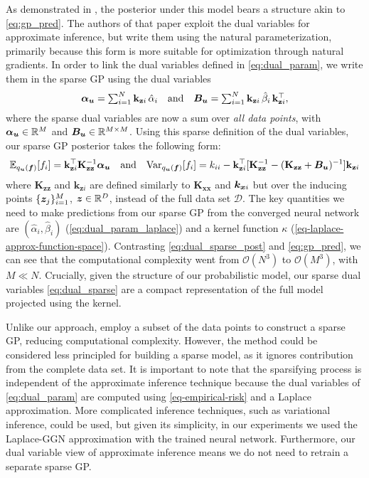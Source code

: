 \documentclass{article} %
\newcommand{\dataset}{\ensuremath{\mathcal{D}}}
\newcommand{\mathbold}[1]{\bm{#1}}
\newcommand{\mbf}[1]{\mathbf{#1}}
\newcommand{\T}{\top}
\newcommand{\valpha}[0]{\mathbold{\alpha}}
\newcommand{\MBeta}[0]{\mathbold{B}}
\newcommand{\MKzz}{\mbf{K}_{\mbf{z}\mbf{z}}}
\newcommand{\MKxx}{\mbf{K}_{\mbf{x}\mbf{x}}}
\newcommand{\vkzi}{\mbf{k}_{\mbf{z}i}}
\newcommand{\vkzs}{\mbf{k}_{\mbf{z}i}}
\newcommand{\myexpect}{\mathbb{E}}
\begin{document}
As demonstrated in \cite{adam2021dual}, the posterior under this model bears a structure akin to \cref{eq:gp_pred}. The authors of that paper exploit the dual variables for approximate inference, but write them using the natural parameterization, primarily because this form is more suitable for optimization through natural gradients. In order to link the dual variables defined in \cref{eq:dual_param}, we write them in the sparse GP using the dual variables
%
\begin{equation} \textstyle
  \valpha_{\vu}  =  \sum_{i=1}^N  \vkzi \, \hat{\alpha}_{i}
  \quad \text{and} \quad
  \MBeta_{\vu} =  \sum_{i=1}^N \vkzi \,\hat{\beta}_{i} \, \vkzi^{\T} ,
\label{eq:dual_sparse}
\end{equation}
%
where the sparse dual variables are now a sum over \emph{all data points}, with $\valpha_{\vu} \in \R^{M}$ and $\MBeta_{\vu} \in \R^{M  \times M}$. Using this sparse definition of the dual variables, our sparse GP posterior takes the following form:
\begin{equation}\label{eq:dual_sparse_post}
   \myexpect_{q_{\vu}(\vf)}[f_i] = \vkzs^{\T} \MKzz^{-1} \valpha_{\vu}
   \quad \text{and} \quad
   \textrm{Var}_{q_{\vu}(\vf)}[f_i]  = k_{ii} - \vkzs^\top [\MKzz^{-1} - (\MKzz + \MBeta_{\vu})^{-1} ]\vkzs
\end{equation}
where $\MKzz$ and $\vkzs$ are defined similarly to $\MKxx$ and ${\bm{k}}_{{\bm{x}} i}$ but over the inducing points $\{{\bm{z}}_j\}_{i=1}^M$, ${\bm{z}} \in \mathbb{R}^{D}$, instead of the full data set $\dataset$. The key quantities we need to make predictions from our sparse GP from the converged neural network are $(\hat{\alpha}_i, \hat{\beta}_i)$ (\cref{eq:dual_param_laplace}) and a kernel function $\kappa$ (\cref{eq-laplace-approx-function-space}). Contrasting \cref{eq:dual_sparse_post} and \cref{eq:gp_pred}, we can see that the computational complexity went from $\mathcal{O}(N^3)$ to $\mathcal{O}(M^3)$, with $M \ll N$.  Crucially, given the structure of our probabilistic model, our sparse dual variables \cref{eq:dual_sparse} are a compact representation of the full model projected using the kernel.

Unlike our approach, \citet{immer2021improving} employ a subset of the data points to construct a sparse GP, reducing computational complexity. However, the method could be considered less principled for building a sparse model, as it ignores contribution from the complete data set. It is important to note that the sparsifying process is independent of the approximate inference technique because the dual variables of \cref{eq:dual_param} are computed using \cref{eq-empirical-risk} and a Laplace approximation. More complicated inference techniques, such as variational inference, could be used, but given its simplicity, in our experiments we used the Laplace-GGN approximation with the trained neural network. Furthermore, our dual variable view of approximate inference means we do not need to retrain a separate sparse GP.
\end{document}
